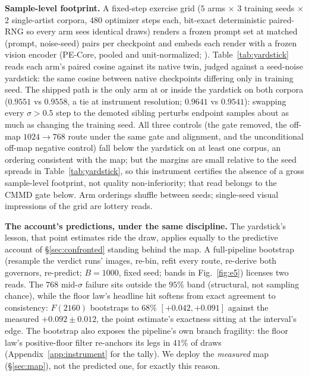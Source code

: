 \textbf{Sample-level footprint.} A fixed-step exercise grid ($5$ arms
$\times$ $3$ training seeds $\times$ $2$ single-artist corpora, $480$
optimizer steps each, bit-exact deterministic paired-RNG so every arm
sees identical draws) renders a frozen prompt set at matched
(prompt, noise-seed) pairs per checkpoint and embeds each render with a
frozen vision encoder (PE-Core, pooled and unit-normalized;
\citealp{bolya2025perception}). Table~\ref{tab:yardstick} reads each
arm's paired cosine against its native twin, judged against a
seed-noise yardstick: the same cosine between native checkpoints
differing only in training seed. The shipped path is the only arm at or
inside the yardstick on both corpora ($0.9551$ vs $0.9558$, a tie at
instrument resolution; $0.9641$ vs $0.9541$): swapping every
$\sigma > 0.5$ step to the demoted sibling perturbs endpoint samples
about as much as changing the training seed. All three controls
(the gate removed, the off-map $1024 {\to} 768$ route under the same
gate and alignment, and the unconditional off-map negative control)
fall below the yardstick on at least one corpus, an ordering
consistent with the map; but the margins are small relative to
the seed spreads in Table~\ref{tab:yardstick}, so this instrument certifies the
absence of a gross sample-level footprint, not quality non-inferiority;
that read belongs to the CMMD gate below. Arm orderings shuffle
between seeds; single-seed visual impressions of the grid are lottery
reads.

\textbf{The account's predictions, under the same discipline.} The
yardstick's lesson, that point estimates ride the draw, applies equally to
the predictive account of \S\ref{sec:confronted} standing behind the
map. A full-pipeline bootstrap (resample the verdict runs' images,
re-bin, refit every route, re-derive both governors, re-predict;
$B{=}1000$, fixed seed; bands in Fig.~\ref{fig:e5}) licenses two reads.
The $768$ mid-$\sigma$ failure sits outside the $95\%$ band
(structural, not sampling chance), while the floor law's headline hit
softens from exact agreement to consistency: $F(2160)$ bootstraps to
$68\%$ $[+0.042, +0.091]$ against the measured $+0.092 \pm 0.012$, the
point estimate's exactness sitting at the interval's edge. The
bootstrap also exposes the pipeline's own branch fragility: the floor
law's positive-floor filter re-anchors its legs in $41\%$ of draws
(Appendix~\ref{app:instrument} for the tally). We deploy the
\emph{measured} map (\S\ref{sec:map}), not the predicted one, for
exactly this reason.

